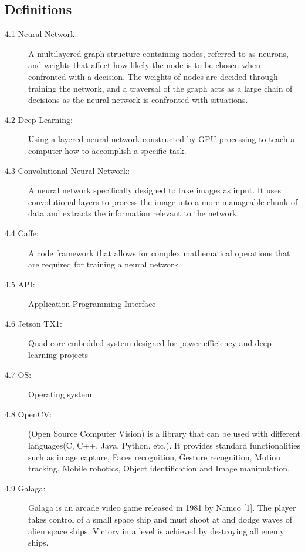 \documentclass{onecolumn, draftclsnofoot,10pt, compsoc}[IEEEtran
\begin{document}
\subsection{Definitions}
\begin{description}

  \item[4.1 Neural Network:] A multilayered graph structure containing nodes, referred to as neurons, and weights that affect how likely the node is to be chosen when confronted with a decision.
The weights of nodes are decided through training the network, and a traversal of the graph acts as a large chain of decisions as the neural network is confronted with situations.

  \item[4.2 Deep Learning:]  Using a layered neural network constructed by GPU processing to teach a computer how to accomplish a specific task.

  \item[4.3 Convolutional Neural Network:] A neural network specifically designed to take images as input.
It uses convolutional layers to process the image into a more manageable chunk of data and extracts the information relevant to the network.

  \item[4.4 Caffe:] A code framework that allows for complex mathematical operations that are required for training a neural network.

  \item[4.5 API:] Application Programming Interface

  \item[4.6 Jetson TX1:] Quad core embedded system designed for power efficiency and deep learning projects

  \item[4.7 OS:] Operating system

  \item[4.8 OpenCV:] (Open Source Computer Vision) is a library that can be used with different languages(C, C++, Java, Python, etc.). It provides standard functionalities such as image capture, Faces recognition, Gesture recognition, Motion tracking, Mobile robotics, Object identification and Image manipulation.

  \item[4.9 Galaga:] Galaga is an arcade video game released in 1981 by Namco [1]. The player takes control of a small space ship and must shoot at and dodge waves of alien space ships.
Victory in a level is achieved by destroying all enemy ships.

\end{description}
\end{document}
